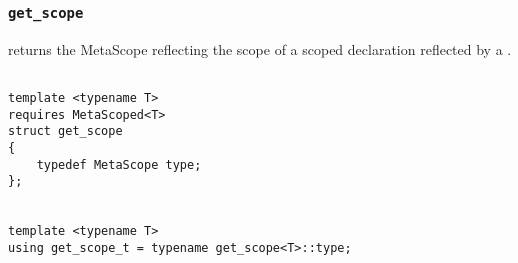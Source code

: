 
\subsubsection{\texttt{get\_scope}}

returns the MetaScope reflecting the scope of a scoped declaration reflected by a .

\begin{verbatim}

template <typename T>
requires MetaScoped<T>
struct get_scope
{
	typedef MetaScope type;
};


template <typename T>
using get_scope_t = typename get_scope<T>::type;

\end{verbatim}
